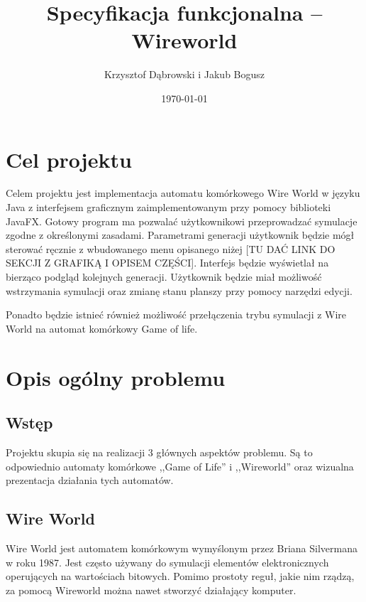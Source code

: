 \documentclass{report}
\title{Specyfikacja funkcjonalna -- Wireworld}
\author{Krzysztof Dąbrowski i Jakub Bogusz}
\date{\today}
\begin{document}
\maketitle{}

\tableofcontents{}

\chapter{Cel projektu}
Celem projektu jest implementacja automatu komórkowego Wire World w języku Java z interfejsem graficznym zaimplementowanym przy pomocy biblioteki JavaFX. Gotowy program ma pozwalać użytkownikowi przeprowadzać symulacje zgodne z określonymi zasadami. Parametrami generacji użytkownik będzie mógł sterować ręcznie z wbudowanego menu opisanego niżej [TU DAĆ LINK DO SEKCJI Z GRAFIKĄ I OPISEM CZĘŚCI].
Interfejs będzie wyświetlał na bierząco podgląd kolejnych generacji. Użytkownik będzie miał możliwość wstrzymania symulacji oraz zmianę stanu planszy przy pomocy narzędzi edycji.

Ponadto będzie istnieć również możliwość przełączenia trybu symulacji z Wire World na automat komórkowy Game of life.

\chapter{Opis ogólny problemu}

\section{Wstęp}
Projektu skupia się na realizacji 3 głównych aspektów problemu. Są to odpowiednio automaty komórkowe ,,Game of Life'' i ,,Wireworld'' oraz wizualna prezentacja działania tych automatów. 

\section{Wire World}

Wire World jest automatem komórkowym wymyślonym przez Briana Silvermana w roku 1987.  Jest często używany do symulacji elementów elektronicznych operujących na wartościach bitowych. Pomimo prostoty reguł, jakie nim rządzą, za pomocą Wireworld można nawet stworzyć działający komputer.
\end{document}
